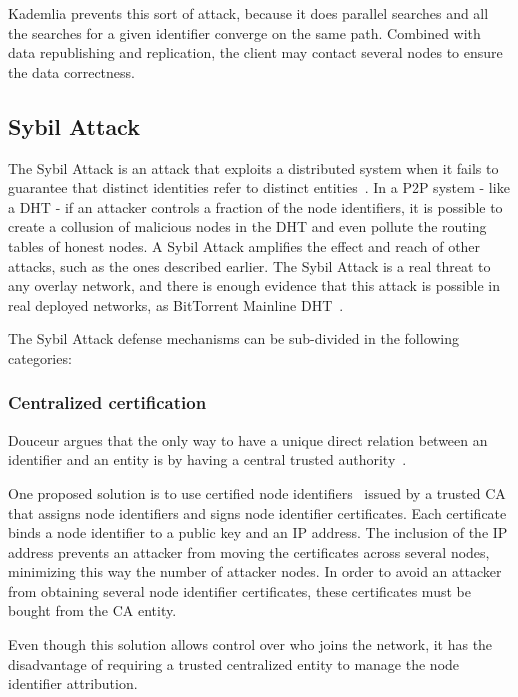 Kademlia prevents this sort of attack, because it does parallel searches and all the searches for a given identifier converge on the same path. Combined with data republishing and replication, the client may contact several nodes to ensure the data correctness.

\subsection{Sybil Attack}


The Sybil Attack is an attack that exploits a
distributed system when it fails to guarantee that distinct identities refer to
distinct entities~\cite{Douceur2002}.
In a \ac{P2P} system - like a \ac{DHT} - if an attacker
controls a fraction of the node identifiers, it is possible to create a collusion
of malicious nodes in the \ac{DHT} and even pollute the routing tables of honest
nodes.
A Sybil Attack amplifies the effect and reach of other attacks, such as the ones described earlier.
The Sybil Attack is a real threat to any overlay network, and there is enough evidence that this attack is possible in real deployed networks, as BitTorrent Mainline \ac{DHT}~\cite{Wang2012}.

The Sybil Attack defense mechanisms can be sub-divided in the following categories:

\subsubsection{Centralized certification}
Douceur argues that the only way to have a unique direct relation between an
identifier and an entity is by having a central trusted authority~\cite{Douceur2002}.

One proposed solution is to use certified node identifiers~\cite{Castro2002} issued by a trusted \ac{CA} that assigns node identifiers and signs node identifier certificates.
Each certificate binds a node identifier to a public key and an IP address.
The inclusion of the IP address prevents an attacker from moving the certificates across several nodes, minimizing this way the number of attacker nodes.
In order to avoid an attacker from obtaining several node identifier certificates, these certificates must be bought from the \ac{CA} entity.

Even though this solution allows control over who joins the network, it has the disadvantage of requiring a trusted centralized entity to manage the node identifier attribution.

